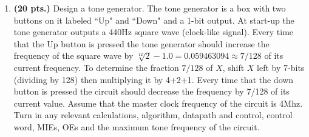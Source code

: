 \begin{enumerate}
\begin{solution}
{} \end{solution}

\item {\bf (20 pts.)}
Design a tone generator.  The tone generator is a box with two buttons
on it labeled ``Up" and ``Down" and a 1-bit output.  At start-up the tone 
generator outputs
a 440Hz square wave (clock-like signal).  Every time that the Up button
is pressed the tone generator should increase the frequency of the square
wave by $\sqrt[12]{2}-1.0 = 0.059463094 \approx 7/128$ of its current frequency.  
To determine the fraction $7/128$ of $X$, shift $X$ left by 7-bits (dividing by
128) then multiplying it by 4+2+1.  Every time that the down button is pressed
the circuit should decrease the frequency by 7/128 of its current value.  Assume
that the master clock frequency of the circuit is 4Mhz.  Turn in 
any relevant calculations, algorithm, datapath and control, control word,
MIEs, OEs and the maximum tone frequency of the circuit.


\end{enumerate}
